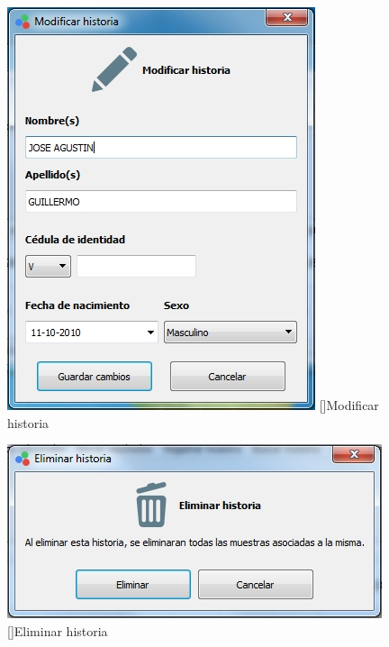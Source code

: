 \begin{figure}[H]
\centering
\begin{minipage}{.5\textwidth}
  \centering
  \includegraphics[width=.9\linewidth]{./img/modificar-historia.jpg}
  []{Modificar historia}
  \label{fig:modificar-historia}
\end{minipage}%
\begin{minipage}{.5\textwidth}
  \centering
  \includegraphics[width=1\linewidth]{./img/eliminar-historia.jpg}
  []{Eliminar historia}
  \label{fig:eliminar-historia}
\end{minipage}
\end{figure}


